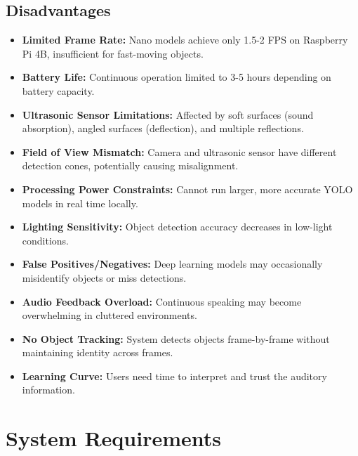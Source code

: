 \documentclass[conference]{IEEEtran}
\begin{document}
\subsection{Disadvantages}
\begin{itemize}
    \item \textbf{Limited Frame Rate:} Nano models achieve only 1.5-2 FPS on Raspberry Pi 4B, insufficient for fast-moving objects.
    \item \textbf{Battery Life:} Continuous operation limited to 3-5 hours depending on battery capacity.
    \item \textbf{Ultrasonic Sensor Limitations:} Affected by soft surfaces (sound absorption), angled surfaces (deflection), and multiple reflections.
    \item \textbf{Field of View Mismatch:} Camera and ultrasonic sensor have different detection cones, potentially causing misalignment.
    \item \textbf{Processing Power Constraints:} Cannot run larger, more accurate YOLO models in real time locally.
    \item \textbf{Lighting Sensitivity:} Object detection accuracy decreases in low-light conditions.
    \item \textbf{False Positives/Negatives:} Deep learning models may occasionally misidentify objects or miss detections.
    \item \textbf{Audio Feedback Overload:} Continuous speaking may become overwhelming in cluttered environments.
    \item \textbf{No Object Tracking:} System detects objects frame-by-frame without maintaining identity across frames.
    \item \textbf{Learning Curve:} Users need time to interpret and trust the auditory information.
\end{itemize}

\section{System Requirements}
\end{document}

